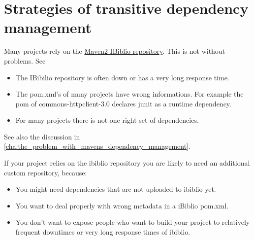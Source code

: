 
\section{Strategies of transitive dependency management} %
\label{sec:strategies_of_transitive_dependency_management}

Many projects rely on the \href{http://repo1.maven.org/maven2}{Maven2 IBiblio repository}. This is not without problems. See 

\begin{itemize}
	\item The IBibilio repository is often down or has a very long response time.
	\item The pom.xml's of many projects have wrong informations. For example the pom of commons-httpclient-3.0 declares junit as a runtime dependency.
	\item For many projects there is not one right set of dependencies. 
\end{itemize} 

See also the discussion in \ref{cha:the_problem_with_mavens_dependency_management}.

If your project relies on the ibiblio repository you are likely to need an additional custom repository, because:
\begin{itemize}
	\item You might need dependencies that are not uploaded to ibiblio yet.
	\item You want to deal properly with wrong metadata in a iBiblio pom.xml.
	\item You don't want to expose people who want to build your project to relatively frequent downtimes or very long response times of ibiblio. 
\end{itemize}

